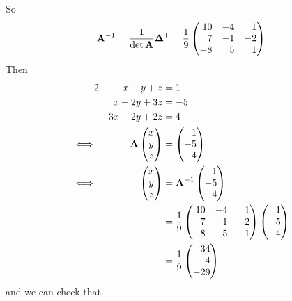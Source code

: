 \documentclass[fleqn,a4paper,11pt]{article}
\begin{document}
\begin{enumerate}[label=\textbf{\arabic*.}]
   So
   \begin{equation*}
    \mat A^{-1}
     = \frac 1{\det \mat A} \tran{\mat \Delta}
     = \frac 19
     \begin{pmatrix*}[r]
      10 & -4 & 1 \\
      7 & -1 & -2 \\
      -8 & 5 & 1
     \end{pmatrix*}
   \end{equation*}
   Then
   \begin{alignat*}2
    && x + y + z &= 1 \\
    && x + 2y + 3z &= -5 \\
    && 3x - 2y + 2z &= 4 \\
    \iff{}&&
     \mat A\begin{pmatrix} x \\ y \\ z \end{pmatrix}
      &= \begin{pmatrix*}[r] 1 \\ -5 \\ 4 \end{pmatrix*} \\
    \iff{}&&
     \begin{pmatrix} x \\ y \\ z \end{pmatrix}
      &= \mat A^{-1}\begin{pmatrix*}[r] 1 \\ -5 \\ 4 \end{pmatrix*} \\
    && &=
    \frac 19
    \begin{pmatrix*}[r]
     10 & -4 & 1 \\
     7 & -1 & -2 \\
     -8 & 5 & 1
    \end{pmatrix*}
    \begin{pmatrix*}[r] 1 \\ -5 \\ 4 \end{pmatrix*} \\
    && &=
    \frac 19 \begin{pmatrix*}[r] 34 \\ 4 \\ -29 \end{pmatrix*}
   \end{alignat*}
   and we can check that
   \begin{align*}

\end{align*}
\end{enumerate}
\end{document}
